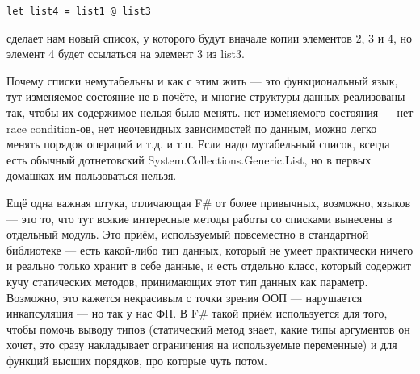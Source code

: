 \documentclass[a5paper]{article}
\begin{document}
\begin{verbatim}
let list4 = list1 @ list3
\end{verbatim}

сделает нам новый список, у которого будут вначале копии элементов 2, 3 и 4, но элемент 4 будет ссылаться на элемент 3 из list3.

Почему списки немутабельны и как с этим жить --- это функциональный язык, тут изменяемое состояние не в почёте, и многие структуры данных реализованы так, чтобы их содержимое нельзя было менять. нет изменяемого состояния --- нет race condition-ов, нет неочевидных зависимостей по данным, можно легко менять порядок операций и т.д. и т.п. Если надо мутабельный список, всегда есть обычный дотнетовский System.Collections.Generic.List, но в первых домашках им пользоваться нельзя.

Ещё одна важная штука, отличающая F\# от более привычных, возможно, языков --- это то, что тут всякие интересные методы работы со списками вынесены в отдельный модуль. Это приём, используемый повсеместно в стандартной библиотеке --- есть какой-либо тип данных, который не умеет практически ничего и реально только хранит в себе данные, и есть отдельно класс, который содержит кучу статических методов, принимающих этот тип данных как параметр. Возможно, это кажется некрасивым с точки зрения ООП --- нарушается инкапсуляция --- но так у нас ФП. В F\# такой приём используется для того, чтобы помочь выводу типов (статический метод знает, какие типы аргументов он хочет, это сразу накладывает ограничения на используемые переменные) и для функций высших порядков, про которые чуть потом.
\end{document}
